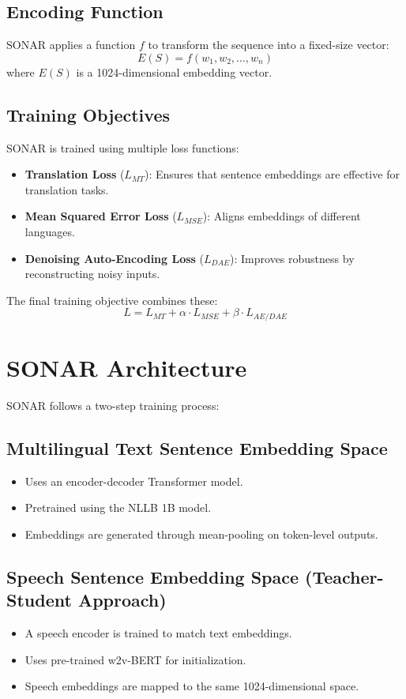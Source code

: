 \subsection{Encoding Function}
SONAR applies a function $f$ to transform the sequence into a fixed-size vector:
\begin{equation}
    E(S) = f(w_1, w_2, \dots, w_n)
\end{equation}
where $E(S)$ is a 1024-dimensional embedding vector.

\subsection{Training Objectives}
SONAR is trained using multiple loss functions:
\begin{itemize}
    \item \textbf{Translation Loss} ($L_{MT}$): Ensures that sentence embeddings are effective for translation tasks.
    \item \textbf{Mean Squared Error Loss} ($L_{MSE}$): Aligns embeddings of different languages.
    \item \textbf{Denoising Auto-Encoding Loss} ($L_{DAE}$): Improves robustness by reconstructing noisy inputs.
\end{itemize}
The final training objective combines these:
\begin{equation}
    L = L_{MT} + \alpha \cdot L_{MSE} + \beta \cdot L_{AE/DAE}
\end{equation}

\section{SONAR Architecture}
SONAR follows a two-step training process:

\subsection{Multilingual Text Sentence Embedding Space}
\begin{itemize}
    \item Uses an encoder-decoder Transformer model.
    \item Pretrained using the NLLB 1B model.
    \item Embeddings are generated through mean-pooling on token-level outputs.
\end{itemize}

\subsection{Speech Sentence Embedding Space (Teacher-Student Approach)}
\begin{itemize}
    \item A speech encoder is trained to match text embeddings.
    \item Uses pre-trained w2v-BERT for initialization.
    \item Speech embeddings are mapped to the same 1024-dimensional space.
\end{itemize}

